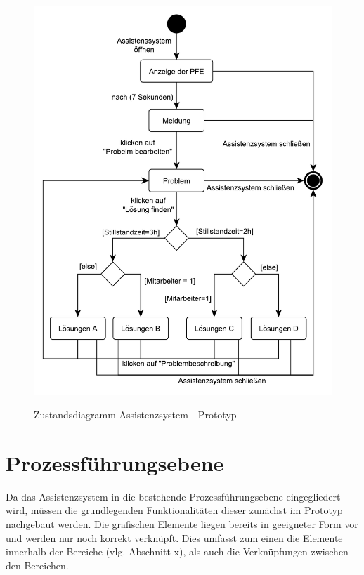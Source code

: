 \begin{figure}[htbp]
\centering
\includegraphics[scale=0.65]{DA_files/UML/Prototyp/Zustandsdiagramm-Assistenzsystem.pdf}
\label{pic:Zustandsdiagramm-Assistenzsystem}
\caption{Zustandsdiagramm Assistenzsystem - Prototyp}
\end{figure}

\section{Prozessführungsebene}
Da das Assistenzsystem in die bestehende Prozessführungsebene eingegliedert wird, müssen die grundlegenden Funktionalitäten dieser zunächst im Prototyp nachgebaut werden. Die grafischen Elemente liegen bereits in geeigneter Form vor und werden nur noch korrekt verknüpft. Dies umfasst zum einen die Elemente innerhalb der Bereiche (vlg. Abschnitt x), als auch die Verknüpfungen zwischen den Bereichen.

